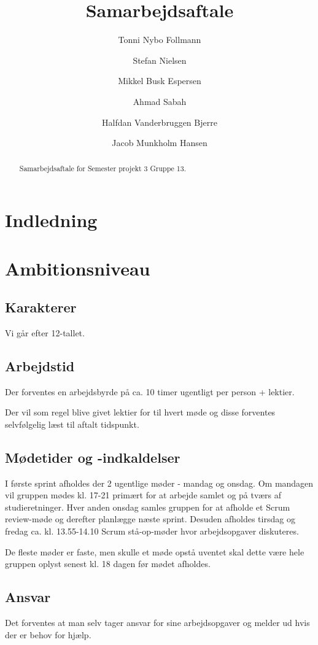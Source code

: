 \documentclass[a4paper,article,11pt,oneside]{memoir}
\title{Samarbejdsaftale}
\author{Tonni Nybo Follmann \and Stefan Nielsen \and Mikkel Busk Espersen \and Ahmad Sabah \and Halfdan Vanderbruggen Bjerre \and Jacob Munkholm Hansen}
\begin{document}
\maketitle

\begin{abstract}
Samarbejdsaftale for Semester projekt 3 Gruppe 13.
\end{abstract}


\frontmatter
\tableofcontents


\mainmatter
\chapter{Indledning}

\chapter{Ambitionsniveau}

\section{Karakterer}
Vi går efter 12-tallet.
\section{Arbejdstid}
Der forventes en arbejdsbyrde på ca. 10 timer ugentligt per person + lektier.

Der vil som regel blive givet lektier for til hvert møde og disse forventes selvfølgelig læst til aftalt tidspunkt.
\section{Mødetider og -indkaldelser}
I første sprint afholdes der 2 ugentlige møder - mandag og onsdag. Om mandagen vil gruppen mødes kl. 17-21 primært for at arbejde samlet og på tværs af studieretninger.
Hver anden onsdag samles gruppen for at afholde et Scrum review-møde og derefter planlægge næste sprint.
Desuden afholdes tirsdag og fredag ca. kl. 13.55-14.10 Scrum stå-op-møder hvor arbejdsopgaver diskuteres.

De fleste møder er faste, men skulle et møde opstå uventet skal dette være hele gruppen oplyst senest kl. 18 dagen før mødet afholdes.

\section{Ansvar}
Det forventes at man selv tager ansvar for sine arbejdsopgaver og melder ud hvis der er behov for hjælp.
\end{document}
